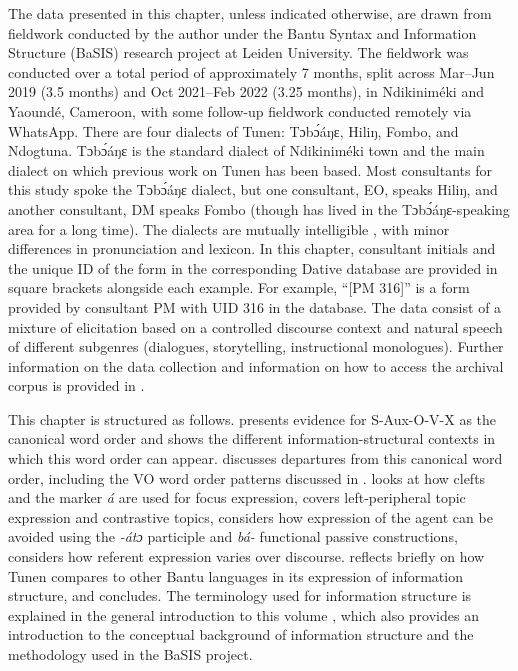 \documentclass[output=paper,colorlinks,citecolor=brown
]{langscibook}
\begin{document}
The data presented in this chapter, unless indicated otherwise, are drawn from fieldwork conducted by the author under the Bantu Syntax and Information Structure (BaSIS) research project at Leiden University. The fieldwork was conducted over a total period of approximately 7 months, split across Mar–Jun 2019 (3.5 months) and Oct 2021–Feb 2022 (3.25 months), in Ndikiniméki and Yaoundé, Cameroon, with some follow-up fieldwork conducted remotely via WhatsApp. There are four dialects of Tunen: Tɔbɔ́áŋɛ, Hiliŋ, Fombo, and Ndogtuna. Tɔbɔ́áŋɛ is the standard dialect of Ndikiniméki town and the main dialect on which previous work on Tunen has been based. Most consultants for this study spoke the Tɔbɔ́áŋɛ dialect, but one consultant, EO, speaks Hiliŋ, and another consultant, DM speaks Fombo (though has lived in the Tɔbɔ́áŋɛ-speaking area for a long time). The dialects are mutually intelligible \citep[8]{Dugast1971}, with minor differences in pronunciation and lexicon. In this chapter, consultant initials and the unique ID of the form in the corresponding Dative database are provided in square brackets  alongside each example. For example, ``[PM 316]'' is a form provided by consultant PM with UID 316 in the database. The data consist of a mixture of elicitation based on a controlled discourse context and natural speech of different subgenres (dialogues, storytelling, instructional monologues). Further information on the data collection and information on how to access the archival corpus \citep{KerrDatabase} is provided in \citet[Chapter 3]{KerrFut}.
 
 This chapter is structured as follows.  presents evidence for S-Aux-O-V-X as the canonical word order and shows the different information-structural contexts in which this word order can appear.  discusses departures from this canonical word order, including the VO word order patterns discussed in \citet{Mous1997, Mous2003}.  looks at how clefts and the marker \textit{á} are used for focus expression,  covers left-peripheral topic expression and contrastive topics,  considers how expression of the agent can be avoided using the \textit{-átɔ} participle and \textit{bá-} functional passive constructions,  considers how referent expression varies over discourse.  reflects briefly on how Tunen compares to other Bantu languages in its expression of information structure, and  concludes. The terminology used for information structure is explained in the general introduction to this volume \parencite{chapters/intro}, which also provides an introduction to the conceptual background of information structure and the methodology used in the BaSIS project.
\end{document}
